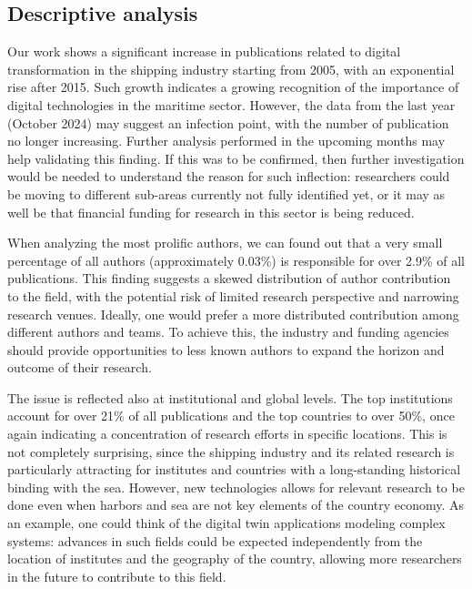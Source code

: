 \documentclass[a4paper, review, endfloat, authoryear]{elsarticle}
\begin{document}
	\subsection{Descriptive analysis}
	Our work shows a significant increase in publications related to digital transformation in the shipping industry starting from 2005, with an exponential rise after 2015. Such growth indicates a growing recognition of the importance of digital technologies in the maritime sector. However, the data from the last year (October 2024) may suggest an infection point, with the number of publication no longer increasing. Further analysis performed in the upcoming months may help validating this finding. If this was to be confirmed, then further investigation would be needed to understand the reason for such inflection: researchers could be moving to different sub-areas currently not fully identified yet, or it may as well be that financial funding for research in this sector is being reduced.
	
	When analyzing the most prolific authors, we can found out that a very small percentage of all authors (approximately 0.03\%) is responsible for over 2.9\% of all publications. This finding suggests a skewed distribution of author contribution to the field, with the potential risk of limited research perspective and narrowing research venues. Ideally, one would prefer a more distributed contribution among different authors and teams. To achieve this, the industry and funding agencies should provide opportunities to less known authors to expand the horizon and outcome of their research.
	
	The issue is reflected also at institutional and global levels. The top institutions account for over 21\% of all publications and the top countries to over 50\%, once again indicating a concentration of research efforts in specific locations. This is not completely surprising, since the shipping industry and its related research is particularly attracting for institutes and countries with a long-standing historical binding with the sea. However, new technologies allows for relevant research to be done even when harbors and sea are not key elements of the country economy. As an example, one could think of the digital twin applications modeling complex systems: advances in such fields could be expected independently from the location of institutes and the geography of the country, allowing more researchers in the future to contribute to this field.
	
\end{document}
